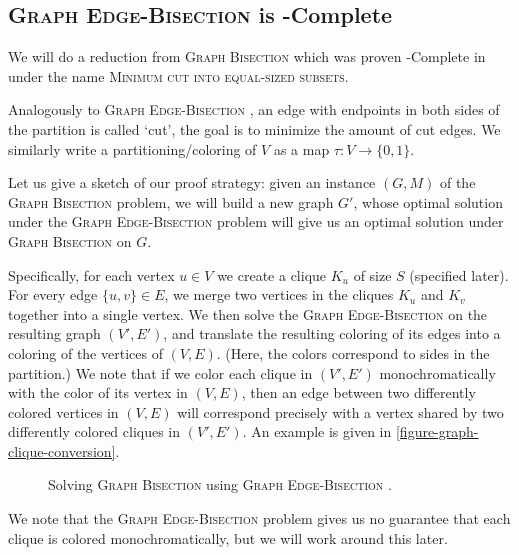 \documentclass{article}
\newcommand{\gb}{\textsc{Graph \allowbreak Bisection} }
\newcommand{\geb}{\textsc{Graph \allowbreak Edge-\allowbreak Bisection} }
\begin{document}
	\subsection{\geb is \NP-Complete}
	We will do a reduction from \gb which was proven \NP-Complete in
	\cite{gb-np-complete} under the name \textsc{Minimum \allowbreak
	cut \allowbreak into \allowbreak equal-\allowbreak sized \allowbreak
	subsets}.

	\begin{problem}
		\problemtitle{\gb}
	\end{problem}

	Analogously to \geb, an edge with endpoints in both sides of the
	partition is called `cut', the goal is to minimize the amount of
	cut edges. We similarly write a partitioning/coloring of $V$ as
	a map $\tau : V \to \{0, 1\}$.

	Let us give a sketch of our proof strategy:
	given an instance $(G, M)$ of the \gb problem, we
	will build a new graph $G'$, whose optimal solution under the 
	\geb problem will give us an optimal solution under \gb on $G$.

	Specifically, for each vertex $u \in V$ we create a clique $K_u$ of size
	$S$ (specified later). For every edge $\{u, v\} \in E$, we merge
	two vertices in the cliques $K_u$ and $K_v$ together into a single
	vertex. We then solve the \geb on the resulting graph $(V', E')$, and
	translate the resulting coloring of its edges into a coloring of the
	vertices of $(V, E)$. (Here, the colors correspond to sides in the
	partition.) We note that if we color each clique in $(V', E')$
	monochromatically with the color of its vertex in $(V, E)$, then
	an edge between two differently colored vertices in $(V, E)$ will
	correspond precisely with a vertex shared by two differently colored
	cliques in $(V', E')$.
	An example is given in \autoref{figure-graph-clique-conversion}.

	\begin{figure}[h]
		
		\centering
		\caption{Solving \gb using \geb.}
		\label{figure-graph-clique-conversion}
	\end{figure}

	We note that
	the \geb problem gives us no guarantee that each clique is colored
	monochromatically, but we will work around this later.
\end{document}
